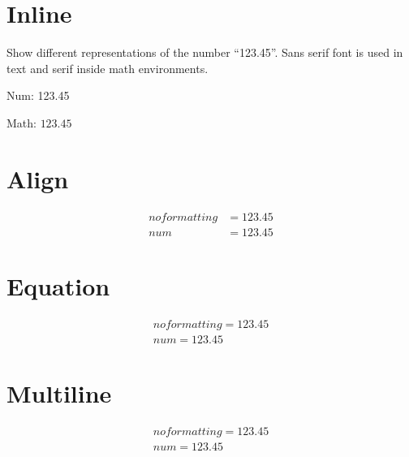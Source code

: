 \documentclass[12pt,oneside]{scrartcl}
\begin{document}
\section{Inline}

Show different representations of the number \enquote{123.45}. Sans serif font is used in text and serif inside math environments.

\bigskip

Num: \num{123.45}

Math: $123.45$

\section{Align}

\begin{align}
no formatting &= 123.45 \\
num &= \num{123.45}
\end{align}

\section{Equation}

\begin{equation}
\begin{split}
no formatting = 123.45 \\
num = \num{123.45}
\end{split}
\end{equation}

\section{Multiline}

\begin{multline}
no formatting = 123.45 \\
num = \num{123.45}
\end{multline}
\end{document}
